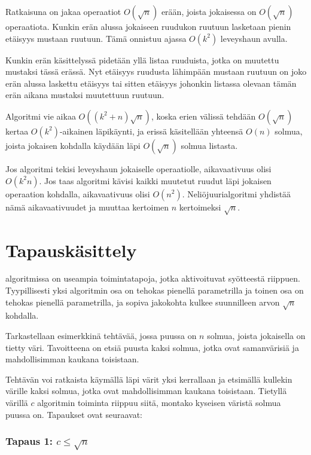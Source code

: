 Ratkaisuna on jakaa operaatiot $O(\sqrt n)$ erään,
joista jokaisessa on $O(\sqrt n)$ operaatiota.
Kunkin erän alussa jokaiseen ruudukon ruutuun
lasketaan pienin etäisyys mustaan ruutuun.
Tämä onnistuu ajassa $O(k^2)$ leveyshaun avulla.

Kunkin erän käsittelyssä pidetään yllä listaa ruuduista,
jotka on muutettu mustaksi tässä erässä.
Nyt etäisyys ruudusta lähimpään mustaan ruutuun
on joko erän alussa laskettu etäisyys tai sitten
etäisyys johonkin listassa olevaan tämän erän aikana mustaksi
muutettuun ruutuun.

Algoritmi vie aikaa $O((k^2+n) \sqrt n)$,
koska erien välissä tehdään $O(\sqrt n)$ kertaa
$O(k^2)$-aikainen läpikäynti, ja
erissä käsitellään yhteensä $O(n)$ solmua,
joista jokaisen kohdalla käydään läpi
$O(\sqrt n)$ solmua listasta.

Jos algoritmi tekisi leveyshaun jokaiselle operaatiolle,
aikavaativuus olisi $O(k^2 n)$.
Jos taas algoritmi kävisi kaikki muutetut ruudut läpi
jokaisen operaation kohdalla,
aikavaativuus olisi $O(n^2)$.
Neliöjuurialgoritmi yhdistää nämä aikavaativuudet
ja muuttaa kertoimen $n$ kertoimeksi $\sqrt n$.

\section{Tapauskäsittely}


 algoritmissa on useampia
toimintatapoja, jotka aktivoituvat syötteestä riippuen.
Tyypillisesti yksi algoritmin osa on tehokas
pienellä parametrilla
ja toinen osa on tehokas pienellä parametrilla,
ja sopiva jakokohta kulkee suunnilleen arvon $\sqrt n$ kohdalla.

Tarkastellaan esimerkkinä tehtävää, jossa
puussa on $n$ solmua, joista jokaisella on tietty väri.
Tavoitteena on etsiä puusta kaksi solmua,
jotka ovat samanvärisiä ja mahdollisimman
kaukana toisistaan.

Tehtävän voi ratkaista
käymällä läpi värit yksi kerrallaan ja
etsimällä kullekin värille kaksi solmua, jotka ovat
mahdollisimman kaukana toisistaan.
Tietyllä värillä $c$ algoritmin toiminta riippuu siitä,
montako kyseisen väristä solmua puussa on.
Tapaukset ovat seuraavat:

\subsubsection*{Tapaus 1: $c \le \sqrt n$}


